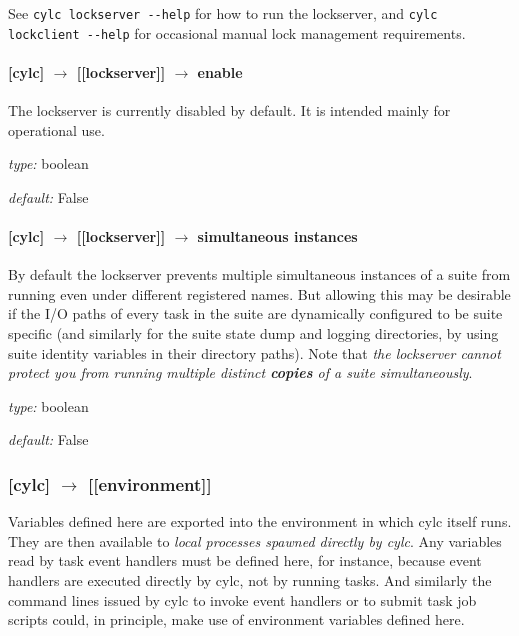 See \lstinline=cylc lockserver --help= for 
how to run the lockserver, and \lstinline=cylc lockclient --help= for 
occasional manual lock management requirements. 

\paragraph[enable]{[cylc] $\rightarrow$ [[lockserver]] $\rightarrow$ enable}

The lockserver is currently disabled by default. It is intended mainly for
operational use.

\begin{myitemize}
    \item {\em type:} boolean
    \item {\em default:} False
\end{myitemize}

\paragraph[simultaneous instances]{[cylc] $\rightarrow$ [[lockserver]] $\rightarrow$ simultaneous instances}

By default the lockserver prevents multiple simultaneous instances of a
suite from running even under different registered names. But allowing
this may be desirable if the I/O paths of every task in the suite are
dynamically configured to be suite specific (and similarly for the suite
state dump and logging directories, by using suite identity variables in
their directory paths). Note that {\em the lockserver cannot protect you
from running multiple distinct {\bf copies} of a suite simultaneously}. 

\begin{myitemize}
    \item {\em type:} boolean
    \item {\em default:} False
\end{myitemize}

\subsubsection[{[[}environment{]]} ]{[cylc] $\rightarrow$ [[environment]]}

Variables defined here are exported into the environment in which cylc
itself runs. They are then available to {\em local processes spawned
directly by cylc}. Any variables read by task event handlers must be
defined here, for instance, because event handlers are executed
directly by cylc, not by running tasks. And similarly the {command
lines} issued by cylc to invoke event handlers or to submit task 
job scripts could, in principle, make use of environment variables
defined here. 
